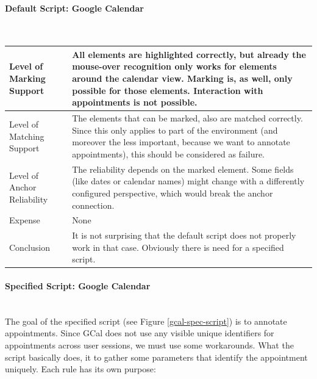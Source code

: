\paragraph{Default Script: Google Calendar}\mbox{}\\
\begin{tabular}{|p{}| p{} |}
\hline 
Level of Marking Support & All elements are highlighted correctly, but already the mouse-over recognition only works for elements around the calendar view. Marking is, as well, only possible for those elements. Interaction with appointments is not possible.\\ 
\hline 
Level of Matching Support & The elements that can be marked, also are matched correctly. Since this only applies to part of the environment (and moreover the less important, because we want to annotate appointments), this should be considered as failure. \\ 
\hline 
Level of Anchor Reliability & The reliability depends on the marked element. Some fields (like dates or calendar names) might change with a differently configured perspective, which would break the anchor connection.  \\ 
\hline 
Expense & None \\ 
\hline 
Conclusion & It is not surprising that the default script does not properly work in that case. Obviously there is need for a specified script.\\ 
\hline 
\end{tabular} 

\paragraph{Specified Script: Google Calendar}\mbox{}\\
The goal of the specified script (see Figure \ref{gcal-spec-script}) is to annotate appointments. Since GCal does not use any visible unique identifiers for appointments across user sessions, we must use some workarounds. What the script basically does, it to gather some parameters that identify the appointment uniquely. Each rule has its own purpose:

